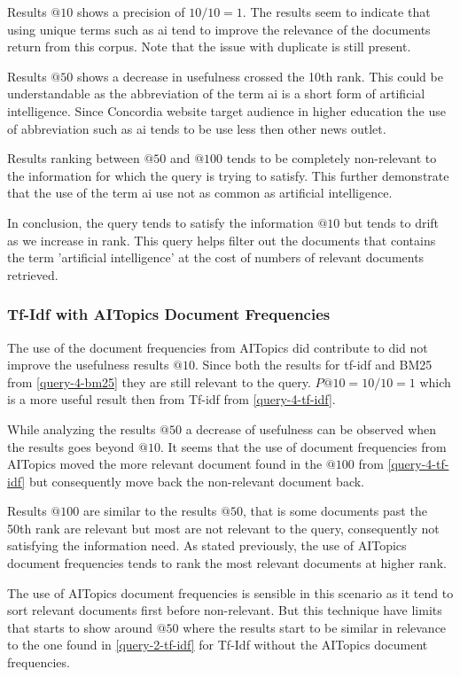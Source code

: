 \par Results $@10$ shows a precision of $10/10=1$. The results seem to indicate that using unique terms such as ai tend to improve the relevance of the documents return from this corpus. Note that the issue with duplicate is still present.
\par Results $@50$ shows a decrease in usefulness crossed the 10th rank. This could be understandable as the abbreviation of the term ai is a short form of artificial intelligence. Since Concordia website target audience in higher education the use of abbreviation such as ai tends to be use less then other news outlet.
\par Results ranking between $@50$ and $@100$ tends to be completely non-relevant to the information for which the query is trying to satisfy. This further demonstrate that the use of the term ai use not as common as artificial intelligence. 
\par In conclusion, the query tends to satisfy the information $@10$ but tends to drift as we increase in rank. This query helps filter out the documents that contains the term 'artificial intelligence' at the cost of numbers of relevant documents retrieved.

\subsubsection{Tf-Idf with AITopics Document Frequencies} \label{query-4-tf-idf-aitopics}

\par The use of the document frequencies from AITopics did contribute to did not improve the usefulness results $@10$. Since both the results for tf-idf and BM25 from \ref{query-4-bm25} they are still relevant to the query. $P@10=10/10=1$ which is a more useful result then from Tf-idf from \ref{query-4-tf-idf}.
\par While analyzing the results $@50$ a decrease of usefulness can be observed when the results goes beyond $@10$. It seems that the use of document frequencies from AITopics moved the more relevant document found in the $@100$ from \ref{query-4-tf-idf} but consequently move back the non-relevant document back.
\par Results $@100$ are similar to the results $@50$, that is some documents past the 50th rank are relevant but most are not relevant to the query, consequently not satisfying the information need. As stated previously, the use of AITopics document frequencies tends to rank the most relevant documents at higher rank.
\par The use of AITopics document frequencies is sensible in this scenario as it tend to sort relevant documents first before non-relevant. But this technique have limits that starts to show around $@50$ where the results start to be similar in relevance to the one found in \ref{query-2-tf-idf} for Tf-Idf without the AITopics document frequencies.

